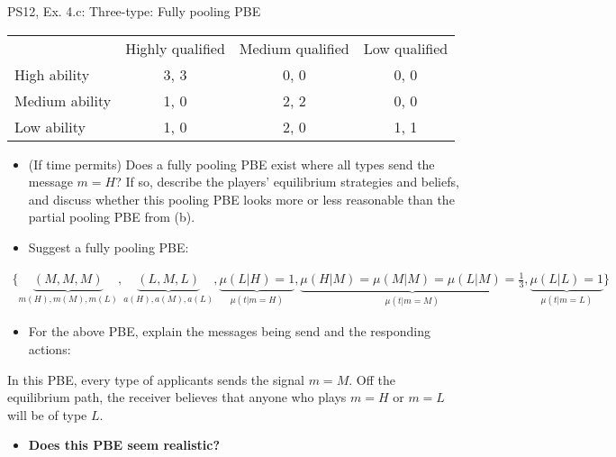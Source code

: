 \begin{frame}{PS12, Ex. 4.c: Three-type: Fully pooling PBE}
    \begin{table}
      \begin{tabular}{l|c|c|c|}
          \multicolumn{1}{c}{} & \multicolumn{1}{c}{Highly qualified} & \multicolumn{1}{c}{Medium qualified} & \multicolumn{1}{c}{Low qualified} \\\cline{2-4}
          High ability   & 3, 3 & 0, 0 & 0, 0 \\\cline{2-4}
          Medium ability & 1, 0 & 2, 2 & 0, 0 \\\cline{2-4}
          Low ability    & 1, 0 & 2, 0 & 1, 1 \\\cline{2-4}
      \end{tabular}
    \end{table}\vspace{-8pt}
    \begin{itemize}
      \item[(c)] (If time permits) Does a fully pooling PBE exist where all types send the message $m = H$? If so, describe the players’ equilibrium strategies and beliefs, and discuss whether this pooling PBE looks more or less reasonable than the partial pooling PBE from (b).
      \item[Step 1:] Suggest a fully pooling PBE:
    \end{itemize}\vspace{-12pt}
    \begin{align*}
      \{\underbrace{(M,M,M)}_{m(H),m(M),m(L)},\underbrace{(L,M,L)}_{a(H),a(M),a(L)},\underbrace{\mu(L|H)=1}_{\mu(t|m=H)},\underbrace{\mu(H|M)=\mu(M|M)=\mu(L|M)=\frac{1}{3}}_{\mu(t|m=M)},\underbrace{\mu(L|L)=1}_{\mu(t|m=L)}\}
    \end{align*}\vspace{-14pt}
    \begin{itemize}
        \item[Step 2:] For the above PBE, explain the messages being send and the responding actions:
    \end{itemize}\vspace{-2pt}
    In this PBE, every type of applicants sends the signal $m=M$. Off the equilibrium path, the receiver believes that anyone who plays $m=H$ or $m=L$ will be of type $L$.\vspace{-2pt}
    \begin{itemize}
        \item[Step 3:] \textbf{Does this PBE seem realistic?}
    \end{itemize}
    \vfill\null
\end{frame}
